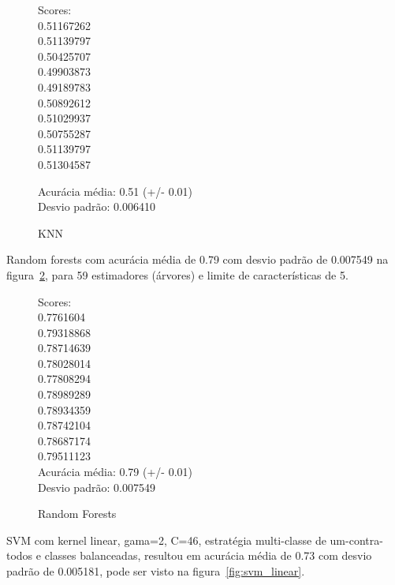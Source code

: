 \documentclass[conference]{IEEEtran}
\begin{document}
\begin{figure}[htb]\caption{KNN}\label{fig:knn}
  \begin{tt}\noindent
  \begin{multicols}{3}
  Scores:\\
  0.51167262\\  0.51139797\\  0.50425707\\  0.49903873\\  0.49189783\\  0.50892612\\
  0.51029937\\  0.50755287\\  0.51139797\\  0.51304587\\
  \end{multicols}
  Acurácia média: 0.51 (+/- 0.01)\\
  Desvio padrão: 0.006410
  \end{tt}
\end{figure}

Random forests com acurácia média de 0.79 com desvio padrão de 0.007549 na figura~\ref{fig:random_forests}, para 59 estimadores (árvores) e limite de características de 5.

\begin{figure}[htb]\caption{Random Forests}\label{fig:random_forests}
  \begin{tt}\noindent
  \begin{multicols}{3}
  Scores:\\
 0.7761604\\   0.79318868\\  0.78714639\\  0.78028014\\  0.77808294\\  0.78989289\\
  0.78934359\\  0.78742104\\  0.78687174\\  0.79511123\\
Acurácia média: 0.79 (+/- 0.01)\\
Desvio padrão: 0.007549
  \end{multicols}
  \end{tt}
\end{figure}

SVM com kernel linear, gama=2, C=46, estratégia multi-classe de um-contra-todos
e classes balanceadas, resultou em acurácia média de 0.73 com desvio padrão de
0.005181, pode ser visto na figura~\ref{fig:svm_linear}.
\end{document}
